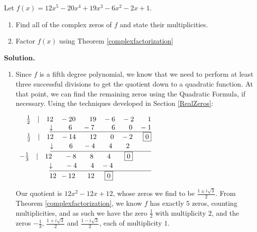 \documentclass{ximera}
\begin{document}
\begin{example}  Let $f(x) = 12x^5 - 20x^4+19x^3-6x^2-2x+1$.

\begin{enumerate}

\item Find all of the complex zeros of $f$ and state their multiplicities.  

\item  Factor $f(x)$ using Theorem \ref{complexfactorization}

\end{enumerate}

{ \bf Solution.}

\begin{enumerate}

\item  Since $f$ is a fifth degree polynomial, we know that we need to perform at least three successful divisions to get the quotient down to a quadratic function.  At that point, we can find the remaining zeros using the Quadratic Formula, if necessary.  Using the techniques developed in Section \ref{RealZeros}:

\begin{center}
$
\begin{array}{r}
 \frac{1}{2} \quad |\quad 12 \quad -20 \phantom{11}\quad 19 \quad -6 \quad -2 \phantom{11}\quad 1\\
 \underline{\downarrow \phantom{11}\quad 6 \phantom{1}\quad -7 \phantom{111}\quad 6 \quad\phantom{11} 0 \quad -1}\\
 \frac{1}{2} \quad |\quad 12 \quad -14 \phantom{11}\quad 12 \phantom{11}\quad 0 \quad -2 \phantom{1}\quad \fbox{0}\\
 \underline{\downarrow \phantom{11}\quad 6 \phantom{1}\quad -4 \phantom{11}\quad 4 \quad\phantom{11} 2 \phantom{\fbox{.} \quad \fbox{0}}}\\
 -\frac{1}{3} \quad |\quad 12 \phantom{1.}\quad -8 \quad\quad 8 \quad\quad 4 \quad\quad \fbox{0} \phantom{1 \quad \fbox{0}}\\
 \underline{\downarrow \phantom{1}\quad -4 \quad\phantom{11} 4\quad -4 \phantom{\fbox{0} \quad \fbox{0} \quad \fbox{0}}}\\
12 \phantom{1} -12 \phantom{1.}\quad 12 \phantom{1}\quad \fbox{0} \phantom{\fbox{0} \quad \fbox{0} \quad \fbox{0}}
\end{array}
$    
\end{center}

Our quotient is $12x^2 - 12x + 12$, whose zeros we find to be $\frac{1 \pm i \sqrt{3}}{2}$.  From Theorem \ref{complexfactorization}, we know $f$ has exactly $5$ zeros, counting multiplicities, and as such we have the zero $\frac{1}{2}$ with multiplicity $2$, and the zeros $-\frac{1}{3}$, $\frac{1 + i \sqrt{3}}{2}$ and $\frac{1 - i \sqrt{3}}{2}$, each of multiplicity $1$.


\end{enumerate}
\end{example}
\end{document}
